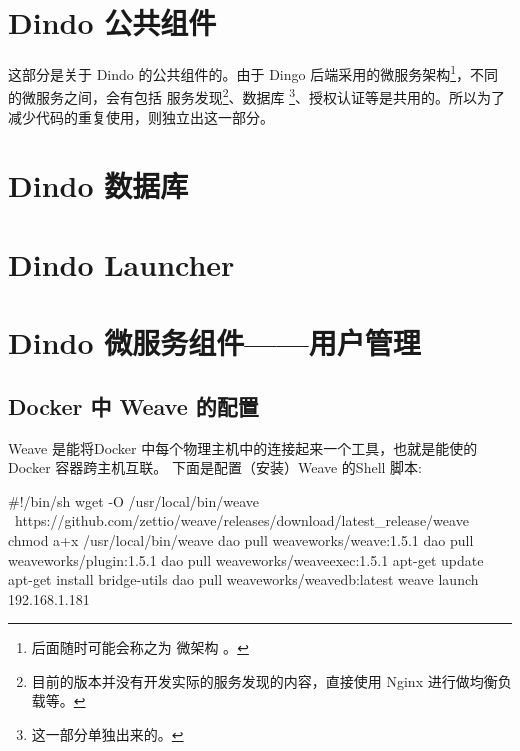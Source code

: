 \documentclass{dingo}
\begin{document}
  \section{Dindo 公共组件}
  这部分是关于 Dindo 的公共组件的。由于 Dingo 后端采用的微服务架构\footnote{后面随时可能会称之为 微架构 。}，不同的微服务之间，会有包括
  服务发现\footnote{目前的版本并没有开发实际的服务发现的内容，直接使用 Nginx 进行做均衡负载等。}、数据库
  \footnote{这一部分单独出来的。}、授权认证等是共用的。所以为了减少代码的重复使用，则独立出这一部分。
  
  \section{Dindo 数据库}
  
  \section{Dindo Launcher}
  
  \section{Dindo 微服务组件——用户管理}
  
  \newpage
  \begin{appendix}
	  	\section{Docker 中 Weave  的配置} %
	  	Weave 是能将Docker 中每个物理主机中的连接起来一个工具，也就是能使的 Docker 容器跨主机互联。
	  	下面是配置（安装）Weave 的Shell 脚本:
	  	\begin{shell}[caption=Weave 安装]
#!/bin/sh
wget -O /usr/local/bin/weave \
https://github.com/zettio/weave/releases/download/latest_release/weave
chmod a+x /usr/local/bin/weave
dao pull weaveworks/weave:1.5.1
dao pull weaveworks/plugin:1.5.1
dao pull weaveworks/weaveexec:1.5.1
apt-get update
apt-get install bridge-utils
dao pull weaveworks/weavedb:latest
weave launch 192.168.1.181
	  	\end{shell}
  \end{appendix} 
  
\end{document}
